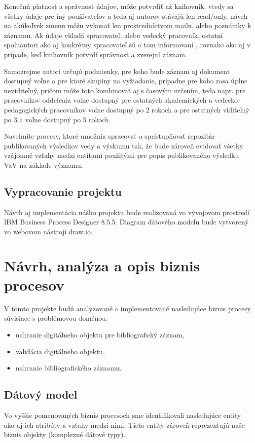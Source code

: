 \documentclass[10pt,oneside,slovak,a4paper]{article}
\begin{document}
Konečnú platnosť a správnosť údajov, môže potvrdiť až knihovník, vtedy sa všetky údaje pre iný používateľov a teda aj autorov stávajú len read/only, návrh na akúkoľvek zmenu môžu vykonať len prostredníctvom mailu, alebo poznámky k záznamu. Ak údaje vkladá spracovateľ, alebo vedecký pracovník, ostatní spoluautori ako aj konkrétny spracovateľ sú o tom informovaní , rovnako ako aj v prípade, keď knihovník potvrdí správnosť a zverejní záznam. 

Samozrejme autori určujú podmienky, pre koho bude záznam aj dokument dostupný voľne a pre ktoré skupiny na vyžiadanie, prípadne pre koho zasa úplne neviditeľný, pričom môže toto kombinovať aj s časovým určením, teda napr. pre pracovníkov oddelenia voľne dostupný pre ostatných akademických a vedecko-pedagogických pracovníkov voľne dostupný po 2 rokoch a pre ostatných viditeľný po 3 a voľne dostupný po 5 rokoch.

Navrhnite procesy, ktoré umožnia spracovať a sprístupňovať repozitár publikovaných výsledkov vedy a výskumu tak, že bude zároveň evidovať všetky vzájomné vzťahy medzi entitami použitými pre popis publikovaného výsledku VaV na základe významu.

\newpage

\subsection{Vypracovanie projektu}
Návrh aj implementácia nášho projektu bude realizovaná vo vývojovom prostredí IBM Business Process Designer 8.5.5. Diagram dátového modelu bude vytvorený vo webovom nástroji draw.io.


\section{Návrh, analýza a opis biznis procesov}

V tomto projekte budú analyzované a implementované nasledujúce biznis procesy súvisiace s problémovou doménou:

\begin{itemize}
\item nahranie digitálneho objektu pre bibliografický záznam,
\item validácia digitálneho objektu,
\item nahranie bibliografického záznamu.
\end{itemize}

\newpage

\subsection{Dátový model}
Vo vyššie pomenovaných biznis procesoch sme identifikovali nasledujúce entity ako aj ich atribúty a vzťahy medzi nimi. Tieto entity zároveň reprezentujú naše biznis objekty (komplexné dátové typy).
\end{document}

